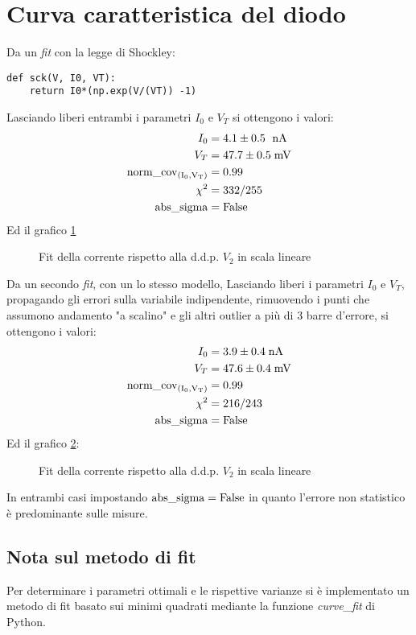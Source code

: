 \documentclass{article}[a4paper, oneside ,11pt]
\begin{document}
\section{Curva caratteristica del diodo}
Da un \emph{fit} con la legge di Shockley:
\begin{lstlisting}
def sck(V, I0, VT):
    return I0*(np.exp(V/(VT)) -1)
\end{lstlisting}
Lasciando liberi entrambi i parametri $I_{0}$ e $V_{T}$ si ottengono i valori:
\begin{align*}
I_{0} &= 4.1 \pm 0.5 \ \; \rm nA \\
V_{T} &= 47.7 \pm 0.5 \; \rm mV \\  
\rm{norm\_cov}_{(I_{0}, V_{T})} &= 0.99 \\ 
\chi^2 &= 332/255 \\
\rm{abs\_sigma} &= \rm False
\end{align*}
Ed il grafico \ref{plt:did}\\
\begin{figure}[!htb]
	\centering 
 		\scalebox{0.9}{}
 	\caption{Fit della corrente rispetto alla d.d.p. $V_2$ in scala lineare \label{plt:did}}
\end{figure}
Da un secondo \emph{fit}, con un lo stesso modello,
Lasciando liberi i parametri $I_{0}$ e $V_{T}$, propagando gli errori sulla variabile indipendente, rimuovendo i punti che assumono andamento "a scalino" e gli altri outlier a più di 3 barre d'errore, si ottengono i valori:
\begin{align*}
I_{0} &= 3.9 \pm 0.4 \; \rm nA \\
V_{T} &= 47.6 \pm 0.4 \; \rm mV \\  
\rm{norm\_cov}_{(I_{0}, V_{T})} &= 0.99 \\ 
\chi^2 &= 216/243 \\
\rm{abs\_sigma} &= \rm False
\end{align*}
Ed il grafico \ref{plt:did_out}:\\
\begin{figure}[!htb]
	\centering 
 		\scalebox{0.9}{}
 	\caption{Fit della corrente rispetto alla d.d.p. $V_2$ in scala lineare \label{plt:did_out}}
\end{figure}
In entrambi casi impostando $\rm{abs\_sigma} = \rm False$ in quanto l'errore non statistico è predominante sulle misure.
\subsection{Nota sul metodo di fit}
Per determinare i parametri ottimali e le rispettive varianze si \`e implementato un metodo di fit basato sui minimi quadrati mediante la funzione \emph{curve\_fit} di Python.
\end{document}

